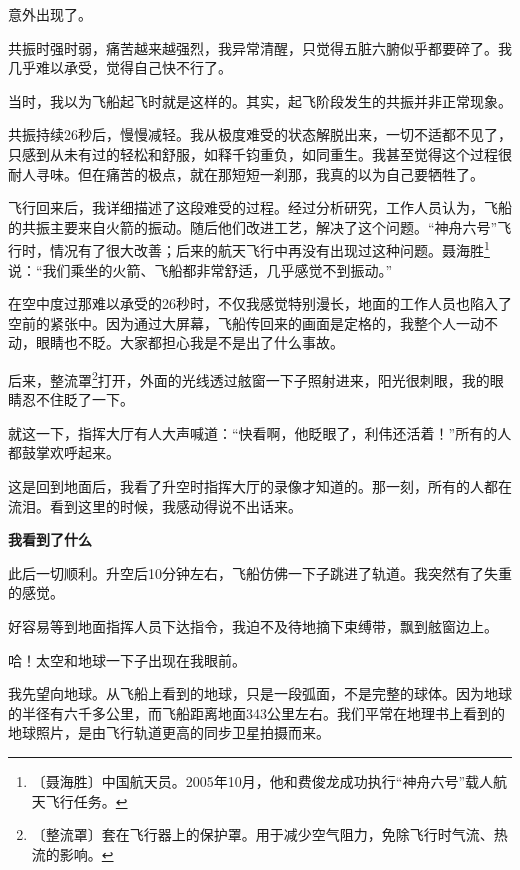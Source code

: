 \documentclass[12pt,UTF-8,openany]{ctexbook}
\begin{document}
\begin{large}
    意外出现了。
    
    共振时强时弱，痛苦越来越强烈，我异常清醒，只觉得五脏六腑似乎都要碎了。我几乎难以承受，觉得自己快不行了。
    
    当时，我以为飞船起飞时就是这样的。其实，起飞阶段发生的共振并非正常现象。
    
    共振持续26秒后，慢慢减轻。我从极度难受的状态解脱出来，一切不适都不见了，只感到从未有过的轻松和舒服，如释千钧重负，如同重生。我甚至觉得这个过程很耐人寻味。但在痛苦的极点，就在那短短一刹那，我真的以为自己要牺牲了。
    
    飞行回来后，我详细描述了这段难受的过程。经过分析研究，工作人员认为，飞船的共振主要来自火箭的振动。随后他们改进工艺，解决了这个问题。“神舟六号”飞行时，情况有了很大改善；后来的航天飞行中再没有出现过这种问题。聂海胜\footnote{〔聂海胜〕中国航天员。2005年10月，他和费俊龙成功执行“神舟六号”载人航天飞行任务。}说：“我们乘坐的火箭、飞船都非常舒适，几乎感觉不到振动。”
    
    在空中度过那难以承受的26秒时，不仅我感觉特别漫长，地面的工作人员也陷入了空前的紧张中。因为通过大屏幕，飞船传回来的画面是定格的，我整个人一动不动，眼睛也不眨。大家都担心我是不是出了什么事故。
    
    后来，整流罩\footnote{〔整流罩〕套在飞行器上的保护罩。用于减少空气阻力，免除飞行时气流、热流的影响。}打开，外面的光线透过舷窗一下子照射进来，阳光很刺眼，我的眼睛忍不住眨了一下。
    
    就这一下，指挥大厅有人大声喊道：“快看啊，他眨眼了，利伟还活着！”所有的人都鼓掌欢呼起来。
    
    这是回到地面后，我看了升空时指挥大厅的录像才知道的。那一刻，所有的人都在流泪。看到这里的时候，我感动得说不出话来。
    
    \begin{center}
    
    \begin{large}\textbf{我看到了什么}\end{large}
    
    \end{center}
    
    此后一切顺利。升空后10分钟左右，飞船仿佛一下子跳进了轨道。我突然有了失重的感觉。
    
    好容易等到地面指挥人员下达指令，我迫不及待地摘下束缚带，飘到舷窗边上。
    
    哈！太空和地球一下子出现在我眼前。
    
    我先望向地球。从飞船上看到的地球，只是一段弧面，不是完整的球体。因为地球的半径有六千多公里，而飞船距离地面343公里左右。我们平常在地理书上看到的地球照片，是由飞行轨道更高的同步卫星拍摄而来。
    

\end{large}
\end{document}
